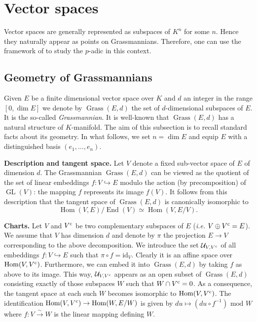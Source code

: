 \documentclass{sig-alternate}
\DeclareMathOperator{\Hom}{Hom}
\DeclareMathOperator{\End}{End}
\DeclareMathOperator{\GL}{GL}
\DeclareMathOperator{\Grass}{Grass}
\newcommand{\id}{\textrm{id}}
\renewcommand{\c}{\text{\rm c}}
\begin{document}
\section{Vector spaces}
\label{sec:vectorspaces}

Vector spaces are generally represented as subspaces of $K^n$ for some 
$n$. Hence they naturally appear as points on Grassmannians. Therefore, 
one can use the framework of \cite[Appendix A]{caruso-roe-vaccon:14a} to 
study the $p$-adic in this context.

\subsection{Geometry of Grassmannians}

Given $E$ be a finite dimensional vector space over $K$ and $d$ an 
integer in the range $[0, \dim E]$ we denote by $\Grass(E,d)$ the 
set of $d$-dimensional subspaces of $E$. It is the so-called 
\emph{Grassmannian}. It is well-known that $\Grass(E,d)$ has a 
natural structure of $K$-manifold. The aim of this subsection is to 
recall standard facts about its geometry. In what follows, we set
$n = \dim E$ and equip $E$ with a distinguished basis $(e_1, \ldots, 
e_n)$.

\smallskip

\noindent
{\bf Description and tangent space.}
Let $V$ denote a fixed sub-vector space of $E$ of dimension $d$. The 
Grassmannian $\Grass(E,d)$ can be viewed as the quotient of the set 
of linear embeddings $f: V \hookrightarrow E$ modulo the action (by 
precomposition) of $\GL(V)$: the mapping $f$ represents its image 
$f(V)$. It follows from this description that the tangent space of 
$\Grass(E,d)$ is canonically isomorphic to $$\Hom(V, E) / \End(V) 
\simeq \Hom(V, E/V).$$

\smallskip

\noindent
{\bf Charts.}
Let $V$ and $V^\c$ be two complementary subspaces of $E$ 
(\emph{i.e.} $V \oplus V^\c = E$). We assume that $V$ has 
dimension $d$ and denote by $\pi$ the projection $E \to V$ 
corresponding to the above decomposition. We introduce the set 
$\mathcal U_{V,V^\c}$ of all embeddings $f : V \hookrightarrow E$ 
such that $\pi \circ f = \id_V$. Clearly it is an affine space over
$\Hom(V,V^\c)$. 
Furthermore, we can embed it into $\Grass(E,d)$ by taking $f$ as
above to its image. This way, $\mathcal U_{V,V^\c}$ appears as
an open subset of $\Grass(E,d)$ consisting exactly of those subspaces 
$W$ such that $W \cap V^\c = 0$. As a consequence, the tangent space 
at each such $W$ becomes isomorphic to $\Hom(V,V^\c)$. The
identification $\Hom(V,V^\c) \to \Hom(W, E/W)$ is given by
$du \mapsto (du \circ f^{-1}) \text{ mod } W$ where $f : V 
\stackrel{\sim}{\to} W$ is the linear mapping defining $W$.
\end{document}
